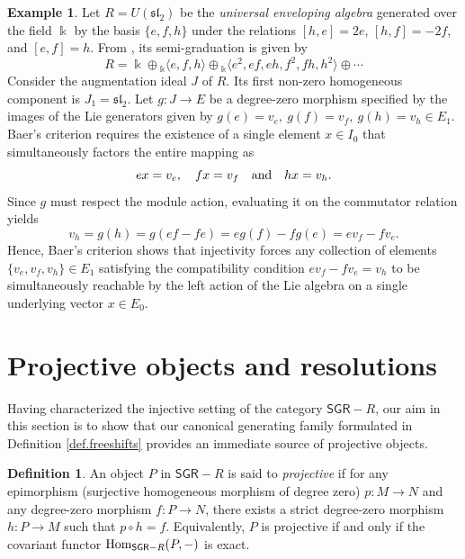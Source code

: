 \documentclass[reqno]{amsart}
\theoremstyle{definition}
\newtheorem{definition}[theorem]{Definition}
\newtheorem{example}[theorem]{Example}
\theoremstyle{remark}
\numberwithin{equation}{section}
\begin{document}
\begin{example}
Let $R = U(\mathfrak{sl}_2)$ be the {\em universal enveloping algebra} generated over the field $\Bbbk$ by the basis $\{e, f, h\}$ under the relations $[h,e]=2e$, $[h,f]=-2f$, and $[e,f]=h$. From \cite[Example 4.9]{Lezama2021}, its semi-graduation is given by 
\begin{equation}
R = \Bbbk \oplus {}_\Bbbk\langle e, f, h \rangle \oplus {}_\Bbbk\langle e^2, ef, eh, f^2, fh, h^2 \rangle \oplus \cdots
\end{equation}
Consider the augmentation ideal $J$ of $R$. Its first non-zero homogeneous component is $J_1 = \mathfrak{sl}_2$. Let $g: J \to E$ be a degree-zero morphism specified by the images of the Lie generators given by $g(e) = v_e, \ g(f) = v_f, \ g(h) = v_h \in E_1$. Baer's criterion requires the existence of a single element $x \in I_0$ that simultaneously factors the entire mapping as
\[
e x = v_e, \quad f x = v_f \quad {\rm and} \quad h x = v_h.
\]
Since $g$ must respect the module action, evaluating it on the commutator relation yields
\[
v_h = g(h) = g(ef - fe) = e g(f) - f g(e) = e v_f - f v_e.
\]
Hence, Baer's criterion shows that injectivity forces any collection of elements $\{v_e, v_f, v_h\} \in E_1$ satisfying the compatibility condition $e v_f - f v_e = v_h$ to be simultaneously reachable by the left action of the Lie algebra on a single underlying vector $x \in E_0$.   
\end{example}


\section{Projective objects and resolutions}\label{Projectiveobjectsandresolutions}

Having characterized the injective setting of the category $\mathsf{SGR}-R$, our aim in this section is to show that our canonical generating family formulated in Definition \ref{def.freeshifts} provides an immediate source of projective objects.


\begin{definition}\label{def.ProjectiveObject}
An object $P$ in $\mathsf{SGR}-R$ is said to {\em projective} if for any epimorphism (surjective homogeneous morphism of degree zero) $p: M \to N$ and any degree-zero morphism $f: P \to N$, there exists a strict degree-zero morphism $h: P \to M$ such that $p \circ h = f$. Equivalently, $P$ is projective if and only if the covariant functor ${\rm Hom}_{\mathsf{SGR}-R}(P, -)$ is exact.
\end{definition}
\end{document}
